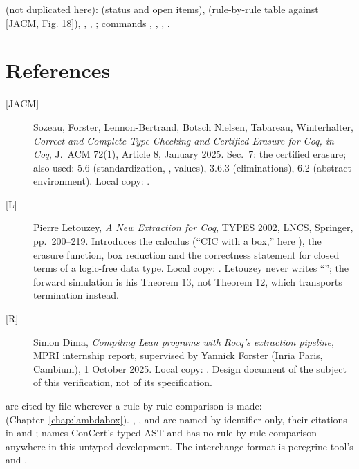  (not duplicated here):  (status and open
items),  (rule-by-rule table against [JACM, Fig. 18]),
, , ; commands
, , ,
.

\section{References}
\label{sec:intro:references}

\begin{description}
\item[{[JACM]}] Sozeau, Forster, Lennon-Bertrand, Botsch Nielsen, Tabareau, Winterhalter, \emph{Correct
and Complete Type Checking and Certified Erasure for Coq, in Coq}, J.\ ACM 72(1), Article 8, January
2025. Sec.\ 7: the certified erasure; also used: 5.6 (standardization, , values),
3.6.3 (eliminations), 6.2 (abstract environment). Local copy: .
\item[{[L]}] Pierre Letouzey, \emph{A New Extraction for Coq}, TYPES 2002, LNCS, Springer,
pp.\ 200--219. Introduces the calculus (``CIC with a box,'' here \lbox{}), the erasure function, box
reduction and the correctness statement for closed terms of a logic-free data type. Local copy:
.  Letouzey never writes ``\lbox{}'';
the forward simulation is his Theorem 13, not Theorem 12, which transports termination instead.
\item[{[R]}] Simon Dima, \emph{Compiling Lean programs with Rocq's extraction pipeline}, MPRI
internship report, supervised by Yannick Forster (Inria Paris, Cambium), 1 October 2025. Local copy:
. Design document of the subject of this
verification, not of its specification.
\end{description}

 are cited by file wherever a rule-by-rule comparison is made: 
(Chapter~\ref{chap:lambdabox}). , ,
 and  are named by identifier only, their citations in
 and ;  names ConCert's typed \lboxT{}
AST and has no rule-by-rule comparison anywhere in this untyped development. The interchange format
is peregrine-tool's  and .


